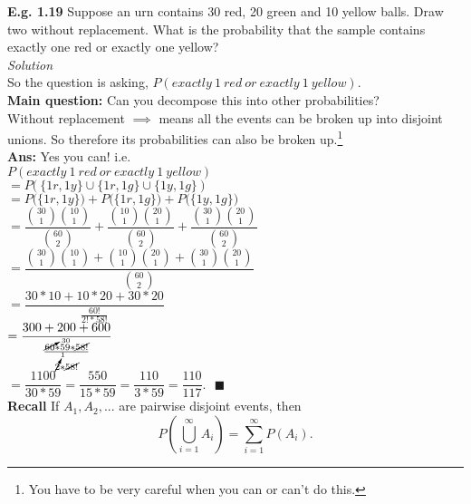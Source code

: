 \documentclass[12pt]{book}
\begin{document}
\noindent \textbf{E.g. 1.19} Suppose an urn contains 30 red, 20 green and 10 yellow balls. Draw two without replacement. What is the probability that the sample contains exactly one red or exactly one yellow?\\ 
\textit{Solution}\\
So the question is asking, $P(exactly~1~red~or~exactly~1~yellow)$.\\
\textbf{Main question:} Can you decompose this into other probabilities?\\
Without replacement $\implies{}$  means all the events can be broken up into disjoint unions. So therefore its probabilities can also be broken up.\footnote{You have to be very careful when you can or can't do this. }\\
\textbf{Ans:} Yes you can! i.e.\\
$P(exactly~1~red~or~exactly~1~yellow)$\\

$= P\big(   ~\{1r,1y\} \cup \{1r,1g\} \cup \{1y,1g\}~   \big)$\\

$=P\big(  \{1r,1y\}  \big) + P\big(  \{1r,1g\}  \big) + P\big(  \{1y,1g\}  \big)$\\

$=\dfrac{{30\choose1}{10\choose1}}{{60\choose2}} + \dfrac{{10\choose1}{20\choose1}}{{60\choose2}} + \dfrac{{30\choose1}{20\choose1}}{{60\choose2}}$\\

$=\dfrac{{30\choose1}{10\choose1}+{10\choose1}{20\choose1}+{30\choose1}{20\choose1}}{{60\choose2}}$\\

$=\dfrac{30*10+10*20+30*20}{\frac{60!}{2!*58!}}$\\

$= \dfrac{300+200+600}{    \frac   {\cancelto{30}{60} *59*\cancel{58!}}  {\cancelto{1}{2} *\cancel{58!}    }      }$ \\

$= \dfrac{1100}{30*59} = \dfrac{550}{15*59} = \dfrac{110}{3*59}=\dfrac{110}{117}.~~~\blacksquare$\\

\noindent \textbf{Recall} If $A_{1},A_{2}, ...$ are pairwise disjoint events, then $$P\left(\bigcup\limits_{i=1}^{\infty}A_{i}\right) = \sum\limits_{i=1}^{\infty}P(A_{i}).$$
\end{document}
